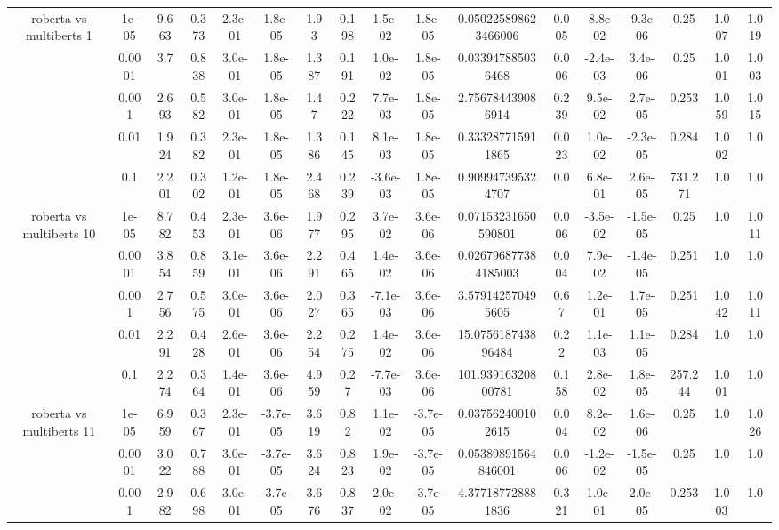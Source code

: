 \begin{tabular}{|c|c|c|c|c|c|c|c|c|c|c|c|c|c|c|c|c|}
\hline
\multirow{5}{*}{roberta  vs multiberts 1} & 1e-05 & 9.663 & 0.373 & 2.3e-01 & 1.8e-05 & 1.93 & 0.198 & 1.5e-02 & 1.8e-05 & 0.050225898623466006 & 0.005 & -8.8e-02 & -9.3e-06 & 0.25 & 1.007 & 1.019 \\
 & 0.0001 & 3.7 & 0.838 & 3.0e-01 & 1.8e-05 & 1.387 & 0.191 & 1.0e-02 & 1.8e-05 & 0.033947885036468 & 0.006 & -2.4e-03 & 3.4e-06 & 0.25 & 1.001 & 1.003 \\
 & 0.001 & 2.693 & 0.582 & 3.0e-01 & 1.8e-05 & 1.47 & 0.222 & 7.7e-03 & 1.8e-05 & 2.756784439086914 & 0.239 & 9.5e-02 & 2.7e-05 & 0.253 & 1.059 & 1.015 \\
 & 0.01 & 1.924 & 0.382 & 2.3e-01 & 1.8e-05 & 1.386 & 0.145 & 8.1e-03 & 1.8e-05 & 0.333287715911865 & 0.023 & 1.0e-02 & -2.3e-05 & 0.284 & 1.002 & 1.0 \\
 & 0.1 & 2.201 & 0.302 & 1.2e-01 & 1.8e-05 & 2.468 & 0.239 & -3.6e-03 & 1.8e-05 & 0.909947395324707 & 0.0 & 6.8e-01 & 2.6e-05 & 731.271 & 1.0 & 1.0 \\
\hline
\multirow{5}{*}{roberta  vs multiberts 10} & 1e-05 & 8.782 & 0.453 & 2.3e-01 & 3.6e-06 & 1.977 & 0.295 & 3.7e-02 & 3.6e-06 & 0.07153231650590801 & 0.006 & -3.5e-02 & -1.5e-05 & 0.25 & 1.0 & 1.011 \\
 & 0.0001 & 3.854 & 0.859 & 3.1e-01 & 3.6e-06 & 2.291 & 0.465 & 1.4e-02 & 3.6e-06 & 0.026796877384185003 & 0.004 & 7.9e-02 & -1.4e-05 & 0.251 & 1.0 & 1.0 \\
 & 0.001 & 2.756 & 0.575 & 3.0e-01 & 3.6e-06 & 2.027 & 0.365 & -7.1e-03 & 3.6e-06 & 3.579142570495605 & 0.67 & 1.2e-01 & 1.7e-05 & 0.251 & 1.042 & 1.011 \\
 & 0.01 & 2.291 & 0.428 & 2.6e-01 & 3.6e-06 & 2.254 & 0.275 & 1.4e-02 & 3.6e-06 & 15.075618743896484 & 0.22 & 1.1e-03 & 1.1e-05 & 0.284 & 1.0 & 1.0 \\
 & 0.1 & 2.274 & 0.364 & 1.4e-01 & 3.6e-06 & 4.959 & 0.27 & -7.7e-03 & 3.6e-06 & 101.93916320800781 & 0.158 & 2.8e-02 & 1.8e-05 & 257.244 & 1.001 & 1.0 \\
\hline
\multirow{5}{*}{roberta  vs multiberts 11} & 1e-05 & 6.959 & 0.367 & 2.3e-01 & -3.7e-05 & 3.619 & 0.82 & 1.1e-02 & -3.7e-05 & 0.037562400102615 & 0.004 & 8.2e-02 & 1.6e-06 & 0.25 & 1.0 & 1.026 \\
 & 0.0001 & 3.022 & 0.788 & 3.0e-01 & -3.7e-05 & 3.624 & 0.823 & 1.9e-02 & -3.7e-05 & 0.05389891564846001 & 0.006 & -1.2e-02 & -1.5e-05 & 0.25 & 1.0 & 1.0 \\
 & 0.001 & 2.982 & 0.698 & 3.0e-01 & -3.7e-05 & 3.676 & 0.837 & 2.0e-02 & -3.7e-05 & 4.377187728881836 & 0.321 & 1.0e-01 & 2.0e-05 & 0.253 & 1.003 & 1.0 \\

\end{tabular}
